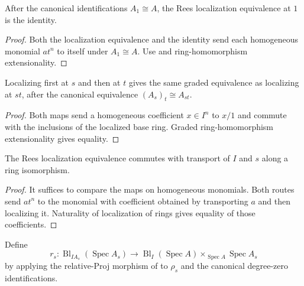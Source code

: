 \begin{lemma}
  \label{lemma:nagata-rees-localization-one}

  After the canonical identifications $A_1\cong A$, the Rees localization
  equivalence at $1$ is the identity.
\end{lemma}

\begin{proof}
  Both the localization equivalence and the identity send each homogeneous
  monomial $at^n$ to itself under $A_1\cong A$.  Use
   and ring-homomorphism extensionality.
\end{proof}

\begin{lemma}
  \label{lemma:nagata-rees-localization-mul}

  Localizing first at $s$ and then at $t$ gives the same graded equivalence as
  localizing at $st$, after the canonical equivalence
  $(A_s)_t\cong A_{st}$.
\end{lemma}

\begin{proof}
  Both maps send a homogeneous coefficient $x\in I^n$ to $x/1$ and commute
  with the inclusions of the localized base ring.  Graded ring-homomorphism
  extensionality gives equality.
\end{proof}

\begin{lemma}
  \label{lemma:nagata-rees-localization-natural}

  The Rees localization equivalence commutes with transport of $I$ and $s$
  along a ring isomorphism.
\end{lemma}

\begin{proof}
  It suffices to compare the maps on homogeneous monomials.  Both routes send
  $at^n$ to the monomial with coefficient obtained by transporting $a$ and
  then localizing it.  Naturality of localization of rings gives equality of
  those coefficients.
\end{proof}

\begin{definition}
  \label{def:nagata-affine-blowup-restriction-map}

  Define
  \[
    r_s\colon
    \operatorname{Bl}_{IA_s}(\operatorname{Spec}A_s)
      \longrightarrow
    \operatorname{Bl}_I(\operatorname{Spec}A)
      \times_{\operatorname{Spec}A}\operatorname{Spec}A_s
  \]
  by applying the relative-Proj morphism of
   to $\rho_s$ and the
  canonical degree-zero identifications.
\end{definition}

